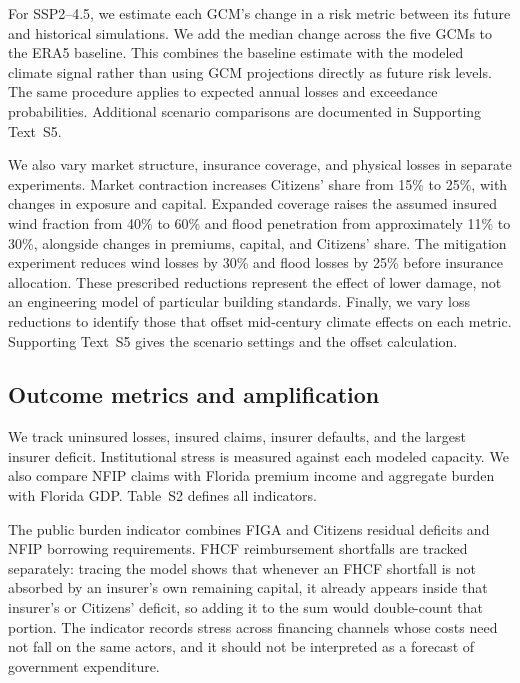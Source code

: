 For SSP2--4.5, we estimate each GCM's change in a risk metric between its future and historical simulations. We add the median change across the five GCMs to the ERA5 baseline. This combines the baseline estimate with the modeled climate signal rather than using GCM projections directly as future risk levels. The same procedure applies to expected annual losses and exceedance probabilities. Additional scenario comparisons are documented in Supporting Text~S5.

We also vary market structure, insurance coverage, and physical losses in separate experiments. Market contraction increases Citizens' share from 15\% to 25\%, with changes in exposure and capital. Expanded coverage raises the assumed insured wind fraction from 40\% to 60\% and flood penetration from approximately 11\% to 30\%, alongside changes in premiums, capital, and Citizens' share. The mitigation experiment reduces wind losses by 30\% and flood losses by 25\% before insurance allocation. These prescribed reductions represent the effect of lower damage, not an engineering model of particular building standards. Finally, we vary loss reductions to identify those that offset mid-century climate effects on each metric. Supporting Text~S5 gives the scenario settings and the offset calculation.

\subsection{Outcome metrics and amplification}\label{MethodsOutput}
We track uninsured losses, insured claims, insurer defaults, and the largest insurer deficit. Institutional stress is measured against each modeled capacity. We also compare NFIP claims with Florida premium income and aggregate burden with Florida GDP. Table~S2 defines all indicators.

The public burden indicator combines FIGA and Citizens residual deficits and NFIP borrowing requirements. FHCF reimbursement shortfalls are tracked separately: tracing the model shows that whenever an FHCF shortfall is not absorbed by an insurer's own remaining capital, it already appears inside that insurer's or Citizens' deficit, so adding it to the sum would double-count that portion. The indicator records stress across financing channels whose costs need not fall on the same actors, and it should not be interpreted as a forecast of government expenditure.

